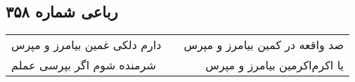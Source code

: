 \begin{center}
\section*{رباعی شماره ۳۵۸}
\label{sec:sh358}
\begin{longtable}{l p{0.5cm} r}
دارم دلکی غمین بیامرز و مپرس
&&
صد واقعه در کمین بیامرز و مپرس
\\
شرمنده شوم اگر بپرسی عملم
&&
یا اکرم‌اکرمین بیامرز و مپرس
\\
\end{longtable}
\end{center}
